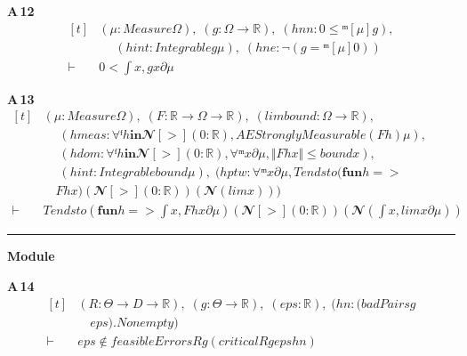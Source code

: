 \noindent\textbf{A\,12}\quad{}
{\footnotesize\[ \begin{aligned}[t]
&(\mu : \mathit{Measure} \Omega ),\; (\mathit{g} : \Omega \to \mathbb{R} ),\; (\mathit{hnn} : 0 \leq  ᵐ[\mu ] \mathit{g}),\\
&\quad \; (\mathit{hint} : \mathit{Integrable} \mathit{g} \mu ),\; (\mathit{hne} : \neg (\mathit{g} =ᵐ[\mu ] 0))\\
\vdash\;&0 < \int \mathit{x}, \mathit{g} \mathit{x} ∂\mu
\end{aligned} \]}

\noindent\textbf{A\,13}\quad{}
{\footnotesize\[ \begin{aligned}[t]
&(\mu : \mathit{Measure} \Omega ),\; (\mathit{F} : \mathbb{R} \to \Omega \to \mathbb{R} ),\; (\mathit{lim} \mathit{bound} : \Omega \to \mathbb{R} ),\\
&\quad \; (\mathit{hmeas} : \forall  ᶠ \mathit{h} \mathbf{in} 𝓝[>] (0:\mathbb{R} ), \mathit{AEStronglyMeasurable} (\mathit{F} \mathit{h}) \mu ),\\
&\quad \; (\mathit{hdom} : \forall  ᶠ \mathit{h} \mathbf{in} 𝓝[>] (0:\mathbb{R} ), \forall  ᵐ \mathit{x} ∂\mu , \Vert \mathit{F} \mathit{h} \mathit{x}\Vert \leq \mathit{bound} \mathit{x}),\\
&\quad \; (\mathit{hint} : \mathit{Integrable} \mathit{bound} \mu ),\; (\mathit{hptw} : \forall  ᵐ \mathit{x} ∂\mu , \mathit{Tendsto} (\mathbf{fun} \mathit{h} =>\\
&\quad \mathit{F} \mathit{h} \mathit{x}) (𝓝[>] (0:\mathbb{R} )) (𝓝 (\mathit{lim} \mathit{x})))\\
\vdash\;&\mathit{Tendsto} (\mathbf{fun} \mathit{h} => \int \mathit{x}, \mathit{F} \mathit{h} \mathit{x} ∂\mu ) (𝓝[>] (0:\mathbb{R} )) (𝓝 (\int \mathit{x}, \mathit{lim} \mathit{x} ∂\mu ))
\end{aligned} \]}

\vspace{4pt}\noindent\rule{\columnwidth}{0.4pt}\par\vspace{2pt}
\noindent\textbf{Module }\par\vspace{3pt}

\noindent\textbf{A\,14}\quad{}
{\footnotesize\[ \begin{aligned}[t]
&(\mathit{R} : \Theta \to \mathit{D} \to \mathbb{R} ),\; (\mathit{g} : \Theta \to \mathbb{R} ),\; (\mathit{eps} : \mathbb{R} ),\; (\mathit{hn} : (\mathit{badPairs} \mathit{g}\\
&\quad \mathit{eps}).\mathit{Nonempty})\\
\vdash\;&\mathit{eps} \notin \mathit{feasibleErrors} \mathit{R} \mathit{g} (\mathit{critical} \mathit{R} \mathit{g} \mathit{eps} \mathit{hn})
\end{aligned} \]}

